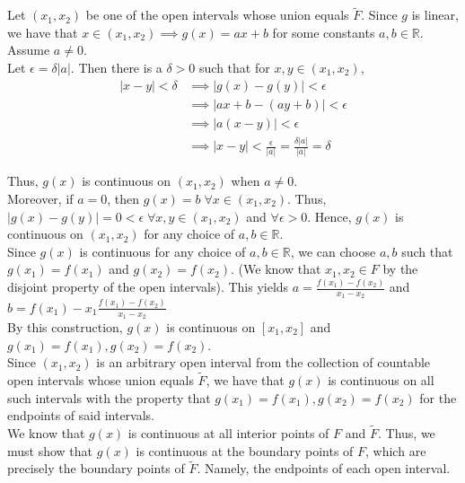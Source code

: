 \documentclass[12pt]{article}
\begin{document}
Let $(x_1, x_2)$ be one of the open intervals whose union equals $\tilde{F}$. Since $g$ is linear, we have that $x \in (x_1, x_2) \implies g(x) = ax + b$ for some constants $a, b \in \mathbb{R}$. Assume $a \neq 0$.\\

Let $\epsilon = \delta|a|$. Then there is a $\delta > 0$ such that for $x, y \in (x_1, x_2)$,
\begin{align*}
|x - y| < \delta &\implies |g(x) - g(y)| < \epsilon\\
&\implies |ax + b - (ay + b)| < \epsilon\\
&\implies |a(x - y)| < \epsilon\\
&\implies |x - y| < \frac{\epsilon}{|a|} = \frac{\delta|a|}{|a|} = \delta
\end{align*}

Thus, $g(x)$ is continuous on $(x_1, x_2)$ when $a \neq 0$.\\

Moreover, if $a = 0$, then $g(x) = b \; \forall x \in (x_1, x_2)$. Thus, $|g(x) - g(y)| = 0 < \epsilon \; \forall x, y \in (x_1, x_2)$ and $\forall \epsilon > 0$. Hence, $g(x)$ is continuous on $(x_1, x_2)$ for any choice of $a, b \in \mathbb{R}$.\\

Since $g(x)$ is continuous for any choice of $a, b \in \mathbb{R}$, we can choose $a, b$ such that $g(x_1) = f(x_1)$ and $g(x_2) = f(x_2)$. (We know that $x_1, x_2 \in F$ by the disjoint property of the open intervals). This yields $a = \frac{f(x_1) - f(x_2)}{x_1 - x_2}$ and $b = f(x_1) - x_1\frac{f(x_1) - f(x_2)}{x_1 - x_2}$\\

By this construction, $g(x)$ is continuous on $[x_1, x_2]$ and $g(x_1) = f(x_1), g(x_2) = f(x_2)$.\\

Since $(x_1, x_2)$ is an arbitrary open interval from the collection of countable open intervals whose union equals $\tilde{F}$, we have that $g(x)$ is continuous on all such intervals with the property that $g(x_1) = f(x_1), g(x_2) = f(x_2)$ for the endpoints of said intervals.\\

We know that $g(x)$ is continuous at all interior points of $F$ and $\tilde{F}$. Thus, we must show that $g(x)$ is continuous at the boundary points of $F$, which are precisely the boundary points of $\tilde{F}$. Namely, the endpoints of each open interval.\\
\end{document}
